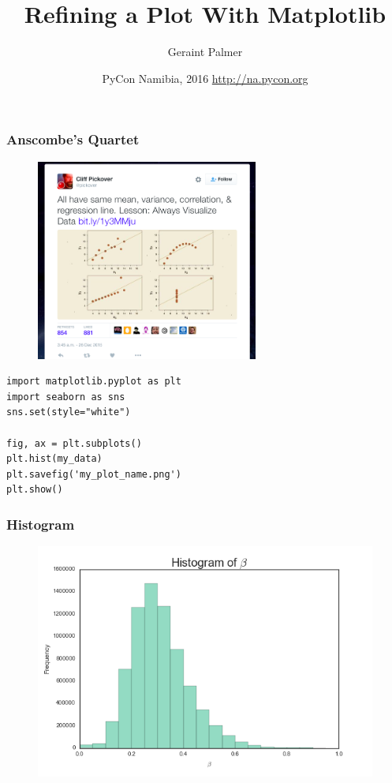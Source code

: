 \documentclass{beamer}
\title{Refining a Plot With Matplotlib}
\author{Geraint Palmer}
\date{PyCon Namibia, 2016 \newline \href{http://na.pycon.org}{\tiny{http://na.pycon.org}}}
\begin{document}
\frame{\titlepage}

\begin{frame}
\frametitle{Anscombe's Quartet}
\begin{figure}
	\includegraphics[width=0.65\textwidth]{anscombetweet}
\end{figure}
\end{frame}

\begin{frame}[fragile]
\begin{verbatim}
import matplotlib.pyplot as plt
import seaborn as sns
sns.set(style="white")

fig, ax = plt.subplots()
plt.hist(my_data)
plt.savefig('my_plot_name.png')
plt.show()
\end{verbatim}
\end{frame}

\begin{frame}
\frametitle{Histogram}
\begin{figure}
	\includegraphics[width=\textwidth]{hist}
\end{figure}
\end{frame}
\end{document}
